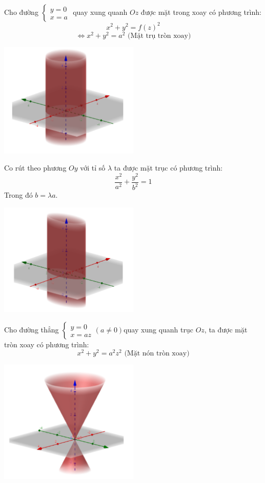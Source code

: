 \documentclass[12pt,a4]{article}
\begin{document}
\begin{titlepage}
Cho đường $\begin{cases}y = 0 \\ x = a \end{cases}$ quay xung quanh $Oz$ được mặt trong xoay có phương trình:
\[
x^2 + y^2 = f(z)^2
\]
\[
\Leftrightarrow x^2 + y^2 = a^2 \text{   (Mặt trụ tròn xoay)}
\]
\begin{center}
      \includegraphics[width=0.5\textwidth]{image/truvanon.png}
\end{center}
Co rút theo phương $Oy$ với tỉ số $\lambda$ ta được mặt trục có phương trình:
\[
\frac{x^2}{a^2} + \frac{y^2}{b^2} = 1
\]
Trong đó $b = \lambda a. $\\
\begin{center}
    \includegraphics[width=0.5\textwidth]{image/truvanon2.png}
\end{center}
Cho đường thẳng $\begin{cases} y = 0\\x = az\end{cases} (a \neq 0)$quay xung quanh trục $Oz$, ta được mặt tròn xoay có phương trình:
\[
x^2 + y^2 = a^2z^2 \text{ (Mặt nón tròn xoay)}
\]
\begin{center}
    \includegraphics[width=0.5\textwidth]{image/truvanon3.png}

\end{center}
\end{titlepage}
\end{document}

